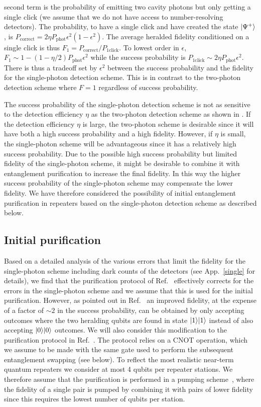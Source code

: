 second term is the probability of emitting two cavity photons but only getting a
single click (we assume that we do not have access to number-resolving
detectors). The probability, to have a single click and have created the state
$| \Psi^{+} \rangle$, is $P_{\text{correct}}=2\eta
P_{\text{phot}}\epsilon^{2}(1-\epsilon^{2})$. The average heralded fidelity
conditioned on a single click is thus
$F_{1}=P_{\text{correct}}/P_{\text{1click}}$. To lowest order in $\epsilon$,
$F_{1}\sim1-(1-\eta/2)P_{\text{phot}}\epsilon^{2}$ while the success probability
is $P_{\text{1click}}\sim2\eta P_{\text{phot}}\epsilon^{2}$. There is thus a
tradeoff set by $\epsilon^{2}$ between the success probability and the fidelity
for the single-photon detection scheme. This is in contrast to the two-photon
detection scheme where $F=1$ regardless of success probability.

The success probability of the single-photon detection scheme is not as
sensitive to the detection efficiency $\eta$ as the two-photon detection scheme
as shown in .
If the detection efficiency $\eta$ is large, the two-photon scheme is desirable
since it will have both a high success probability and a high fidelity. However,
if $\eta$ is small, the single-photon scheme will be advantageous since it has a
relatively high success probability. Due to the possible high success
probability but limited fidelity of the single-photon scheme, it might be
desirable to combine it with entanglement purification to increase the final
fidelity. In this way the higher success probability of the single-photon scheme
may compensate the lower fidelity. We have therefore considered the possibility
of initial entanglement purification in repeaters based on the single-photon
detection scheme as described below.

\subsection{Initial purification}
Based on a detailed analysis of the various errors that limit the fidelity for
the single-photon scheme including dark counts of the detectors (see
App.~\ref{single} for details), we find that the purification protocol of
Ref.~\cite{bennett} effectively corrects for the errors in the single-photon
scheme and we assume that this is used for the initial purification. However, as
pointed out in Ref.~\cite{nickerson} an improved fidelity, at the expense of a
factor of $\sim2$ in the success probability, can be obtained by only accepting
outcomes where the two heralding qubits are found in state $| 1 \rangle| 1 \rangle$
instead of also accepting $| 0 \rangle| 0 \rangle$ outcomes. We will also consider this
modification to the purification protocol in Ref.~\cite{bennett}. The protocol
relies on a CNOT operation, which we assume to be made with the same gate used
to perform the subsequent entanglement swapping (see below). To reflect the most
realistic near-term quantum repeaters we consider at most 4 qubits per repeater
stations. We therefore assume that the purification is performed in a pumping
scheme~\cite{briegel2}, where the fidelity of a single pair is pumped by
combining it with pairs of lower fidelity since this requires the lowest number
of qubits per station.

